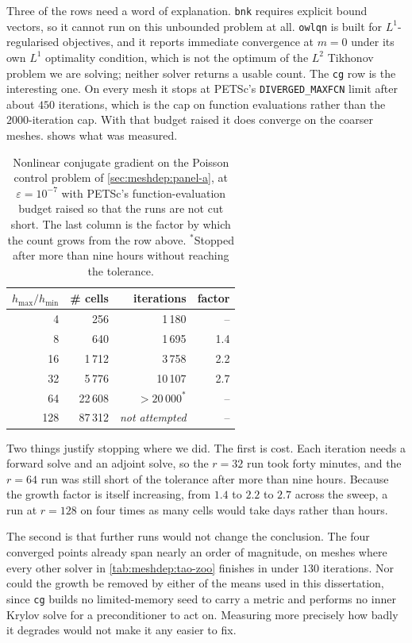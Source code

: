 \documentclass[a4paper,11pt]{article}
\theoremstyle{spacedplain} \newtheorem{theorem}[counter]{Theorem} \newtheorem{lemma}[counter]{Lemma} \newtheorem{prop}[counter]{Proposition} \newtheorem{cor}[counter]{Corollary}
\theoremstyle{spaceddefinition} \newtheorem{defn}[counter]{Definition} \newtheorem{example}[counter]{Example} \newtheorem{remark}[counter]{Remark}
\begin{document}
Three of the rows need a word of explanation. \texttt{bnk} requires explicit bound vectors, so it cannot run on this unbounded problem at all. \texttt{owlqn} is built for $L^{1}$-regularised objectives, and it reports immediate convergence at $m = 0$ under its own $L^{1}$ optimality condition, which is not the optimum of the $L^{2}$ Tikhonov problem we are solving; neither solver returns a usable count. The \texttt{cg} row is the interesting one. On every mesh it stops at PETSc's \texttt{DIVERGED\_MAXFCN} limit after about $450$ iterations, which is the cap on function evaluations rather than the $2000$-iteration cap. With that budget raised it does converge on the coarser meshes.  shows what was measured.

\begin{table}[H]
  \centering
  \begin{tabular}{r r r r}
    \toprule
    {$h_{\max}/h_{\min}$} & {\# cells} & {iterations} & {factor} \\
    \midrule
      4 &     256 &  1\,180 & {--} \\
      8 &     640 &  1\,695 & 1.4 \\
     16 &   1\,712 &  3\,758 & 2.2 \\
     32 &   5\,776 & 10\,107 & 2.7 \\
     64 &  22\,608 & $> 20\,000^{\ast}$ & {--} \\
    128 &  87\,312 & \textit{not attempted} & {--} \\
    \bottomrule
  \end{tabular}
  \caption{Nonlinear conjugate gradient on the Poisson control problem of \cref{sec:meshdep:panel-a}, at $\varepsilon = 10^{-7}$ with PETSc's function-evaluation budget raised so that the runs are not cut short. The last column is the factor by which the count grows from the row above. $^{\ast}$Stopped after more than nine hours without reaching the tolerance.}
  \label{tab:meshdep:cg-detail}
\end{table}

Two things justify stopping where we did. The first is cost. Each iteration needs a forward solve and an adjoint solve, so the $r = 32$ run took forty minutes, and the $r = 64$ run was still short of the tolerance after more than nine hours. Because the growth factor is itself increasing, from $1.4$ to $2.2$ to $2.7$ across the sweep, a run at $r = 128$ on four times as many cells would take days rather than hours.

The second is that further runs would not change the conclusion. The four converged points already span nearly an order of magnitude, on meshes where every other solver in \cref{tab:meshdep:tao-zoo} finishes in under $130$ iterations. Nor could the growth be removed by either of the means used in this dissertation, since \texttt{cg} builds no limited-memory seed to carry a metric and performs no inner Krylov solve for a preconditioner to act on. Measuring more precisely how badly it degrades would not make it any easier to fix.
\end{document}
